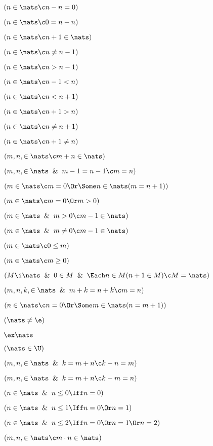  $(n \in \nats \c n - n =0)$

 $(n \in \nats \c 0 = n - n)$

 $(n \in \nats \c n + 1 \in \nats)$

 $(n\in\nats \c n \ne n-1)$

 $(n\in\nats \c n > n-1)$

 $(n\in\nats \c  n-1 < n)$

 $(n\in\nats \c n < n+1)$

 $(n\in\nats \c n+1 > n)$

 $(n\in\nats \c n \ne n+1)$

 $(n\in\nats \c  n+1 \ne n)$

 $(m,n, \in \nats \c m + n  \in \nats)$

 $(m,n,\in\nats \And m-1 = n-1 \c m = n)$

 $(m \in \nats \c m = 0 \Or\Some n \in\nats(m = n+1))$

 $(m \in \nats \c m = 0 \Or m > 0)$

 $(m \in \nats \And m > 0 \c m-1 \in \nats)$

 $(m \in \nats \And m \ne 0 \c m-1 \in \nats)$

 $(m \in \nats \c 0\le m)$

 $(m \in \nats \c m \ge 0)$

 $(M \i \nats \And 0 \in M \And \Each n \in M(n+1 \in M)
	\c M = \nats)$

 $(m,n,k, \in \nats \And m+k = n + k \c m = n)$ 

 $(n \in \nats \c n = 0 \Or \Some m \in \nats
(n = m + 1))$

 $(\nats \ne \e)$

 $\ex\nats$

 $(\nats \in \U)$

 $(m,n , \in \nats \And k = m + n \c k - n = m)$ 

 $(m,n , \in \nats \And k = m + n \c k - m = n)$ 

 $(n \in \nats \And n \le 0 \Iff n = 0)$

 $(n \in \nats \And n \le 1 \Iff n = 0 \Or n=1)$

 $(n \in \nats \And n \le 2\Iff n=0\Or n=1\Or n=2)$

 $(m,n,\in \nats \c m\cdot n \in \nats)$


